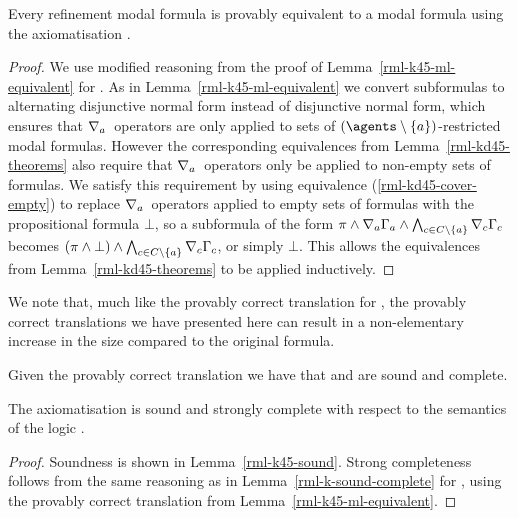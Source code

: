 \begin{lemma}\label{rml-kd45-ml-equivalent}
Every refinement modal formula is provably equivalent to a modal formula using the axiomatisation \axiomRmlKFF{}.
\end{lemma}

\begin{proof}
We use modified reasoning from the proof of Lemma~\ref{rml-k45-ml-equivalent} for \axiomRmlKFF{}.
As in Lemma~\ref{rml-k45-ml-equivalent} we convert subformulas to alternating disjunctive normal form instead of disjunctive normal form, which ensures that $\nabla_{a}$~operators are only applied to sets of $(\agents \setminus \{\agentA\})$-restricted modal formulas.
However the corresponding equivalences from Lemma~\ref{rml-kd45-theorems} also require that $\nabla_{a}$~operators only be applied to non-empty sets of formulas.
We satisfy this requirement by using equivalence (\ref{rml-kd45-cover-empty}) to replace $\nabla_{a}$~operators applied to empty sets of formulas with the propositional formula $\bot$, so a subformula of the form $\pi \land \nabla_{a} \Gamma_a \land \bigwedge_{c \in C \setminus \{a\}} \nabla_{c} \Gamma_c$ becomes $(\pi \land \bot) \land \bigwedge_{c \in C \setminus \{a\}} \nabla_{c} \Gamma_c$, or simply $\bot$.
This allows the equivalences from Lemma~\ref{rml-kd45-theorems} to be applied inductively.
\end{proof}

We note that, much like the provably correct translation for \logicRmlK{}, the provably correct translations we have presented here can result in a non-elementary increase in the size compared to the original formula.

Given the provably correct translation we have that \axiomRmlKFF{} and \axiomRmlKD{} are sound and complete.

\begin{theorem}\label{rml-k45-sound-complete}
The axiomatisation \axiomRmlKFF{} is sound and strongly complete with respect to the semantics of the logic \logicRmlKFF{}.
\end{theorem}

\begin{proof}
Soundness is shown in Lemma~\ref{rml-k45-sound}.
Strong completeness follows from the same reasoning as in Lemma~\ref{rml-k-sound-complete} for \axiomRmlK{}, using the provably correct translation from Lemma~\ref{rml-k45-ml-equivalent}.
\end{proof}

